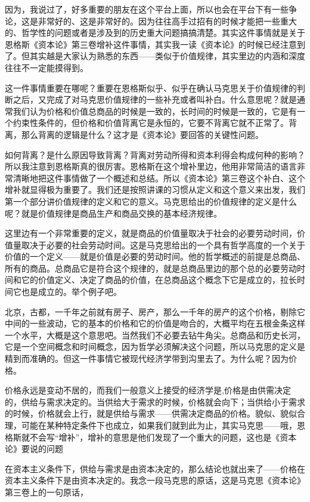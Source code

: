 \documentclass[UTF8, 12pt, a4paper]{ctexrep}
\begin{document}
因为，我说过了，好多重要的朋友在这个平台上面，所以也会在平台下有一些争论，这是非常好的、这是非常好的。因为往往高手过招有的时候才能把一些重大的、哲学性的问题或者是涉及到的历史重大问题搞搞清楚。其实这件事情就是关于恩格斯《资本论》第三卷增补这件事情，其实我一读《资本论》的时候已经注意到了。但其实越是大家认为熟悉的东西——类似于价值规律，其实里边的内涵和深度往往不一定能摸得到。

这一件事情重要在哪呢？重要在恩格斯似乎、似乎在确认马克思关于价值规律的判断之后，又完成了对马克思价值规律的一些补充或者叫补白。什么意思呢？就是通常我们认为价格和价值总商品的时候是一致的，长时间的时候是一致的，它是有一个约束性条件的，但价格和价值背离它是永恒的，它要不背离它就不正常了。背离，那么背离的逻辑是什么？这才是《资本论》要回答的关键性问题。

如何背离？是什么原因导致背离？背离对劳动所得和资本利得会构成何种的影响？所以我注意到恩格斯真的很厉害。恩格斯在这个增补里边，他用非常简洁的语言非常清晰地把这件事情做了一个概述和总结。所以《资本论》第三卷这个补白、这个增补就显得极为重要了。我们还是按照讲课的习惯从定义和这个意义来出发，我们第一个部分讲价值规律的定义和它的意义。马克思给出的价值规律的定义是什么呢？就是价值规律是商品生产和商品交换的基本经济规律。

这里边有一个非常重要的定义，就是商品的价值量取决于社会的必要劳动时间，价值量取决于必要的社会劳动时间。这是马克思给出的一个具有哲学高度的一个关于价值的一个定义——就是价值是必要的劳动时间。他的哲学概述的前提是总商品、所有的商品。总商品它是符合这个规律的，就是总商品里边的那个总的必要劳动时间和它的价值定义、决定了商品的价值，在总商品这个概念下它是成立的，拉长时间它也是成立的。举个例子吧。

北京，古都，一千年之前就有房子、房产，那么一千年的房产的这个价格，剔除它中间的一些波动，它的基本的价格和它的价值是吻合的，大概平均在五根金条这样一个水平，大概是这个意思吧。当然我们不必要去钻牛角尖。总商品和历史长河，它是一个空间概念和时间概念，因为哲学必须解决这个问题，所以马克思的定义是精到而准确的。但这一件事情它被现代经济学带到沟里去了。为什么呢？因为价格。

价格永远是变动不居的，而我们一般意义上接受的经济学是,价格是由供需决定的，供给与需求决定的。当供给大于需求的时候，价格就会向下；当供给小于需求的时候，价格就会上行，就是供给与需求——供需决定商品的价格。貌似、貌似合理，可能在某种特定条件下也成立，如果我们就到此为止，其实马克思——哦，恩格斯就不会写“增补”，增补的意思是他们发现了一个重大的问题，这也是《资本论》要说的问题

在资本主义条件下，供给与需求是由资本决定的，那么结论也就出来了——价格在资本主义条件下是由资本决定的。我念一段马克思的原话，这是马克思《资本论》第三卷上的一句原话，
\end{document}
